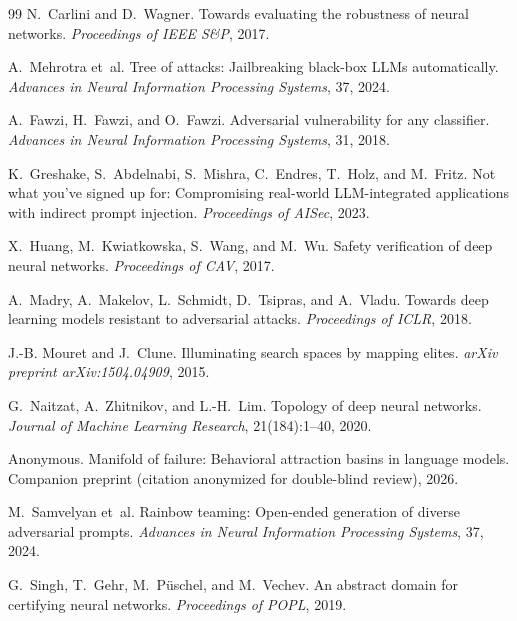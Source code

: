 \documentclass[11pt]{article}
\begin{document}
\begin{thebibliography}{99}
N.~Carlini and D.~Wagner.
\newblock Towards evaluating the robustness of neural networks.
\newblock \emph{Proceedings of IEEE S\&P}, 2017.

A.~Mehrotra et~al.
\newblock Tree of attacks: Jailbreaking black-box {LLMs} automatically.
\newblock \emph{Advances in Neural Information Processing Systems}, 37,
2024.

A.~Fawzi, H.~Fawzi, and O.~Fawzi.
\newblock Adversarial vulnerability for any classifier.
\newblock \emph{Advances in Neural Information Processing Systems}, 31, 2018.

K.~Greshake, S.~Abdelnabi, S.~Mishra, C.~Endres, T.~Holz, and M.~Fritz.
\newblock Not what you've signed up for: Compromising real-world
  {LLM}-integrated applications with indirect prompt injection.
\newblock \emph{Proceedings of AISec}, 2023.

X.~Huang, M.~Kwiatkowska, S.~Wang, and M.~Wu.
\newblock Safety verification of deep neural networks.
\newblock \emph{Proceedings of CAV}, 2017.

A.~Madry, A.~Makelov, L.~Schmidt, D.~Tsipras, and A.~Vladu.
\newblock Towards deep learning models resistant to adversarial attacks.
\newblock \emph{Proceedings of ICLR}, 2018.

J.-B. Mouret and J.~Clune.
\newblock Illuminating search spaces by mapping elites.
\newblock \emph{arXiv preprint arXiv:1504.04909}, 2015.

G.~Naitzat, A.~Zhitnikov, and L.-H.~Lim.
\newblock Topology of deep neural networks.
\newblock \emph{Journal of Machine Learning Research}, 21(184):1--40, 2020.

Anonymous.
\newblock Manifold of failure: Behavioral attraction basins in language
  models.
\newblock Companion preprint (citation anonymized for double-blind
  review), 2026.

M.~Samvelyan et~al.
\newblock Rainbow teaming: Open-ended generation of diverse adversarial
  prompts.
\newblock \emph{Advances in Neural Information Processing Systems}, 37,
2024.

G.~Singh, T.~Gehr, M.~P{\"u}schel, and M.~Vechev.
\newblock An abstract domain for certifying neural networks.
\newblock \emph{Proceedings of POPL}, 2019.


\end{thebibliography}
\end{document}
